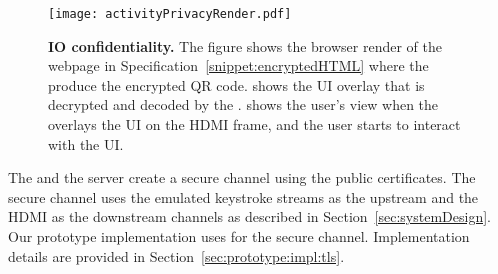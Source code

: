 \begin{figure}[t]
\centering
\texttt{[image: activityPrivacyRender.pdf]}
\caption{\textbf{\name IO confidentiality.} The figure shows \one the browser render of the webpage in Specification~\ref{snippet:encryptedHTML} where the \name \js produce the encrypted QR code. \two shows the UI overlay that is decrypted and decoded by the \device. \three shows the user's view when the \device overlays the UI on the HDMI frame, and the user starts to interact with the UI.}
\spacesave
\label{fig:activityPrivacy}
\centering
\end{figure}


 The \device and the server create a secure channel using the public certificates. The secure channel uses the emulated keystroke streams as the upstream and the HDMI as the downstream channels as described in Section~\ref{sec:systemDesign}. Our prototype implementation uses \tls for the secure channel. Implementation details are provided in Section~\ref{sec:prototype:impl:tls}. 

